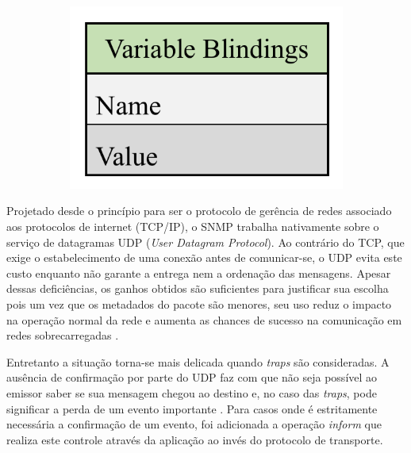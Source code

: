 \documentclass[twoside,english,brazilian]{UNISINOSmonografia}
\begin{document}
\begin{figure}
\begin{subfigure}[b]{0.27\textwidth}
    \end{subfigure}
\hspace{.1\textwidth}
    \begin{subfigure}[b]{0.27\textwidth}
        \includegraphics[width=\textwidth,keepaspectratio=true]{snmp_pdu_varbinds}
    \end{subfigure}
\end{figure}


Projetado desde o princípio para ser o protocolo de gerência de redes 
associado aos protocolos de internet (TCP/IP), o SNMP trabalha nativamente 
sobre o serviço de datagramas UDP (\textit{User Datagram Protocol}).
Ao contrário do TCP, que exige o estabelecimento de uma conexão antes de 
comunicar-se, o UDP evita este custo enquanto não garante a entrega nem 
a ordenação das mensagens.
Apesar dessas deficiências, os ganhos obtidos são suficientes para justificar 
sua escolha pois um vez que os metadados do pacote são menores, seu uso reduz 
o impacto na operação normal da rede e aumenta as chances de sucesso na 
comunicação em redes sobrecarregadas \cite{Mauro2009}.


Entretanto a situação torna-se mais delicada quando \textit{traps} são 
consideradas. 
A ausência de confirmação por parte do UDP faz com que não seja possível ao 
emissor saber se sua mensagem chegou ao destino e, no caso das \textit{traps}, 
pode significar a perda de um evento importante \cite{Clemm2006}.
Para casos onde é estritamente necessária a confirmação de um evento, foi 
adicionada a operação \textit{inform} que realiza este controle através da 
aplicação ao invés do protocolo de transporte.
\end{document}
